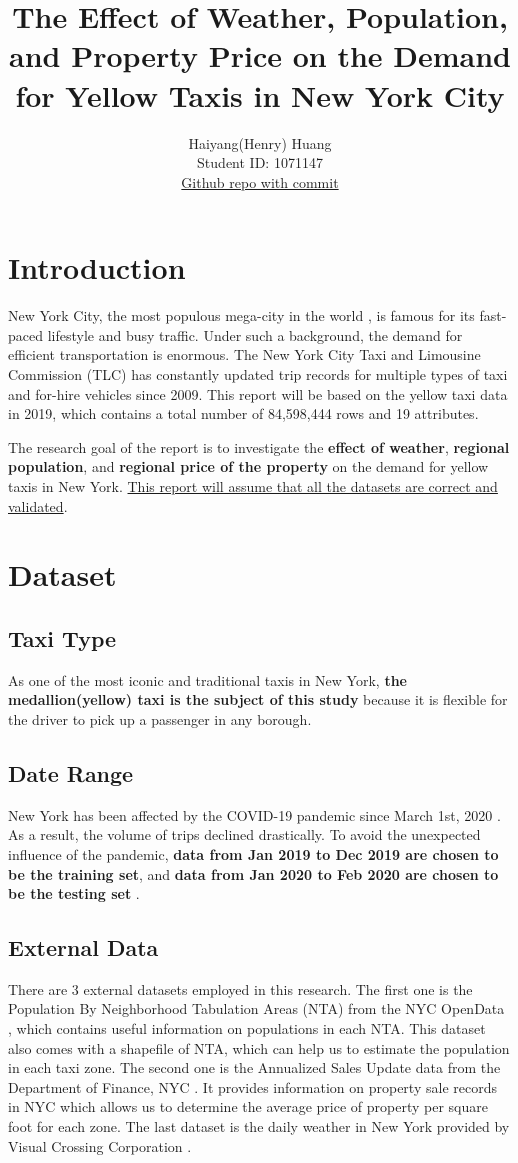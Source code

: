 \documentclass[11pt]{article}
\title{\textbf{The Effect of Weather, Population, and Property Price on the Demand for Yellow Taxis in New York City}}
\author{
Haiyang(Henry) Huang \\
Student ID: 1071147 \\
\href{https://github.com/MAST30034-Applied-Data-Science/mast30034-project-1-HenryHuang2}{Github repo with commit}
}
\begin{document}
\maketitle

\section{Introduction}
New York City, the most populous mega-city in the world \cite{nycintro}, is famous for its fast-paced lifestyle and busy traffic. Under such a background, the demand for efficient transportation is enormous. The New York City Taxi and Limousine Commission (TLC) has constantly updated trip records for multiple types of taxi and for-hire vehicles since 2009. This report will be based on the yellow taxi data in 2019\cite{tlcdata}, which contains a total number of 84,598,444 rows and 19 attributes.


The research goal of the report is to investigate the \textbf{effect of weather}, \textbf{regional population}, and \textbf{regional price of the property} on the demand for yellow taxis in New York. \ul{This report will assume that all the datasets are correct and validated}.

\section{Dataset}
\subsection{Taxi Type}
As one of the most iconic and traditional taxis in New York, \textbf{the medallion(yellow) taxi is the subject of this study} because it is flexible for the driver to pick up a passenger in any borough.
\subsection{Date Range}
New York has been affected by the COVID-19 pandemic since March 1st, 2020 \cite{covidintro}. As a result, the volume of trips declined drastically. To avoid the unexpected influence of the pandemic, \textbf{data from Jan 2019 to Dec 2019 are chosen to be the training set}, and \textbf{data from Jan 2020 to Feb 2020 are chosen to be the testing set} \cite{tlcdata}. 
\subsection{External Data}
There are 3 external datasets employed in this research. The first one is the Population By Neighborhood Tabulation Areas (NTA) from the NYC OpenData \cite{populationdata}, which contains useful information on populations in each NTA. This dataset also comes with a shapefile of NTA, which can help us to estimate the population in each taxi zone. The second one is the Annualized Sales Update data from the Department of Finance, NYC \cite{propertydata}. It provides information on property sale records in NYC which allows us to determine the average price of property per square foot for each zone. The last dataset is the daily weather in New York provided by Visual Crossing Corporation \cite{weatherdata}.
\end{document}
